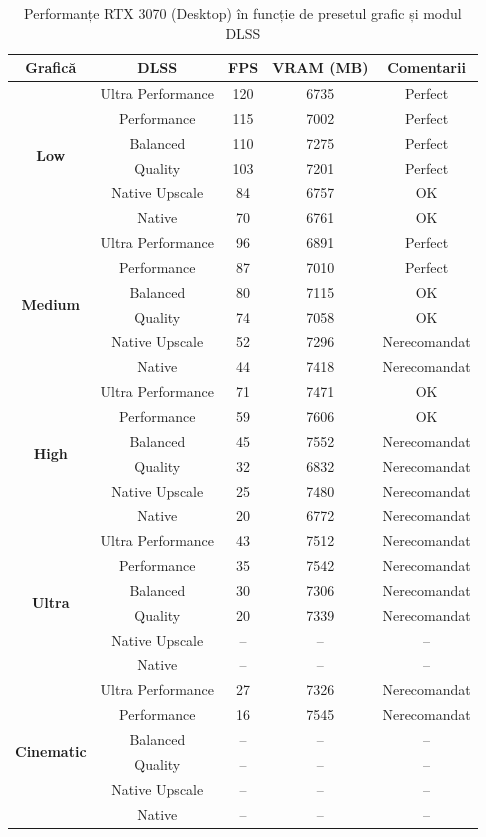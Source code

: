 \begin{table}[htbp]
\centering
\renewcommand{\arraystretch}{1.2}
\begin{tabular}{|c|c|c|c|c|}
\hline
\textbf{Grafică} & \textbf{DLSS} & \textbf{FPS} & \textbf{VRAM (MB)} & \textbf{Comentarii} \\
\hline
\multirow{6}{*}{\textbf{Low}} & Ultra Performance & 120 & 6735 & Perfect \\
 & Performance       & 115 & 7002 & Perfect \\
 & Balanced          & 110 & 7275 & Perfect \\
 & Quality           & 103 & 7201 & Perfect \\
 & Native Upscale    & 84  & 6757 & OK \\
 & Native            & 70  & 6761 & OK \\
\hline
\multirow{6}{*}{\textbf{Medium}} & Ultra Performance & 96 & 6891 & Perfect \\
 & Performance       & 87 & 7010 & Perfect \\
 & Balanced          & 80 & 7115 & OK \\
 & Quality           & 74 & 7058 & OK \\
 & Native Upscale    & 52 & 7296 & Nerecomandat \\
 & Native            & 44 & 7418 & Nerecomandat \\
\hline
\multirow{6}{*}{\textbf{High}} & Ultra Performance & 71 & 7471 & OK \\
 & Performance       & 59 & 7606 & OK \\
 & Balanced          & 45 & 7552 & Nerecomandat \\
 & Quality           & 32 & 6832 & Nerecomandat \\
 & Native Upscale    & 25 & 7480 & Nerecomandat \\
 & Native            & 20 & 6772 & Nerecomandat \\
\hline
\multirow{6}{*}{\textbf{Ultra}} & Ultra Performance & 43 & 7512 & Nerecomandat \\
 & Performance       & 35 & 7542 & Nerecomandat \\
 & Balanced          & 30 & 7306 & Nerecomandat \\
 & Quality           & 20 & 7339 & Nerecomandat \\
 & Native Upscale    & -- & --   & -- \\
 & Native            & -- & --   & -- \\
\hline
\multirow{6}{*}{\textbf{Cinematic}} & Ultra Performance & 27 & 7326 & Nerecomandat \\
 & Performance       & 16 & 7545 & Nerecomandat \\
 & Balanced          & -- & --   & -- \\
 & Quality           & -- & --   & -- \\
 & Native Upscale    & -- & --   & -- \\
 & Native            & -- & --   & -- \\
\hline
\end{tabular}
\caption{Performanțe RTX 3070 (Desktop) în funcție de presetul grafic și modul DLSS}
\label{tab:rtx3070desktop}
\end{table}


